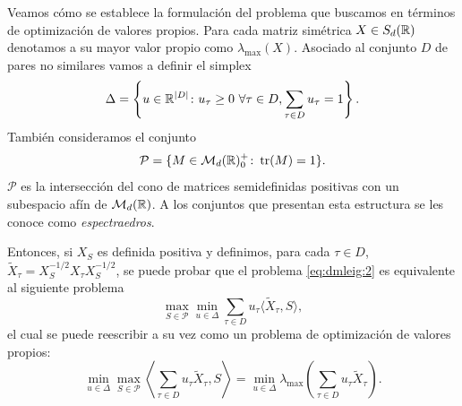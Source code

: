 Veamos cómo se establece la formulación del problema que buscamos en términos de optimización de valores propios. Para cada matriz simétrica $X \in S_d(\mathbb{R})$ denotamos a su mayor valor propio como $\lambda_{\max}(X)$. Asociado al conjunto $D$ de pares no similares vamos a definir el simplex
\[ \Delta = \left\{u \in \mathbb{R}^{|D|} \colon u_\tau \ge 0 \ \forall \tau \in D, \sum_{\tau \in D} u_{\tau} = 1 \right\}. \]
También consideramos el conjunto
\[ \mathcal{P} = \{M \in \mathcal{M}_d(\mathbb{R})^+_0 \colon \operatorname{tr}(M) = 1 \}.  \]
$\mathcal{P}$ es la intersección del cono de matrices semidefinidas positivas con un subespacio afín de $\mathcal{M}_d(\mathbb{R})$. A los conjuntos que presentan esta estructura se les conoce como \emph{espectraedros}. 

Entonces, si $X_S$ es definida positiva y definimos, para cada $\tau \in D$, $\widetilde{X}_{\tau} = X_S^{-1/2}X_{\tau}X_S^{-1/2}$, se puede probar \cite{dmleig} que el problema \ref{eq:dmleig:2} es equivalente al siguiente problema
  \begin{equation} \label{eq:dmleig:3}
      \max_{S \in \mathcal{P}} \min_{u \in \Delta} \sum_{\tau \in D} u_{\tau}\langle \widetilde{X}_{\tau},S\rangle,
  \end{equation}
  el cual se puede reescribir a su vez como un problema de optimización de valores propios:
  \begin{equation} \label{eq:dmleig:4}
      \min_{u \in \Delta} \max_{S \in \mathcal{P}} \left\langle \sum_{\tau \in D} u_{\tau} \widetilde{X}_{\tau},S\right\rangle = \min_{u \in \Delta} \lambda_{\max}\left( \sum_{\tau\in D}u_{\tau}\widetilde{X}_{\tau} \right).
  \end{equation}

